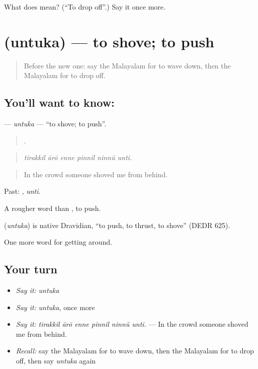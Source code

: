 \begin{tcolorbox}[breakable,colback=teal!4,colframe=teal!35!black,title={Before you move on}]
What does  mean? (\textquotedblleft{}To drop off\textquotedblright{}.) Say it once more.
\end{tcolorbox}
\section[\texorpdfstring{\ml{ഉന്തുക} (untuka)}{ഉന്തുക (untuka)}]{ (untuka) — to shove; to push}

\label{lesson:ML-C473-untuka}



\begin{quote}
Before the new one: say the Malayalam for to wave down, then the Malayalam for to drop off.
\end{quote}

\subsection*{You'll want to know: }
\textbf{} — \emph{untuka} — \textquotedblleft{}to shove; to push\textquotedblright{}.

\begin{quote}
     .
\end{quote}

\begin{quote}
\emph{tirakkil ārō enne pinnil ninnŭ unti.}
\end{quote}

\begin{quote}
In the crowd someone shoved me from behind.
\end{quote}

Past: , \emph{unti}.

A rougher word than , to push.

\begin{cousinweb}
\textbf{} (\emph{untuka}) is native Dravidian, \textquotedblleft{}to push, to thrust, to shove\textquotedblright{} (DEDR 625).
\end{cousinweb}

\begin{grammarlens}[title={What you've built}]
One more word for getting around.
\end{grammarlens}

\subsection*{Your turn}
\begin{itemize}
\raggedright
  \item \emph{Say it:} \emph{untuka}
  \item \emph{Say it:} \emph{untuka}, once more
  \item \emph{Say it:} \emph{tirakkil ārō enne pinnil ninnŭ unti.} — In the crowd someone shoved me from behind.
  \item \emph{Recall:} say the Malayalam for to wave down, then the Malayalam for to drop off, then say \emph{untuka} again
\end{itemize}

